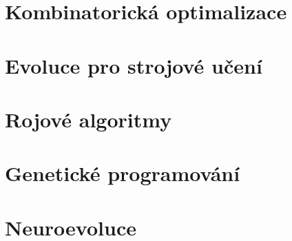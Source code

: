 \documentclass[a4paper,nofonts,nohyper,justified,colorinlistoftodos,hidelinks]{tufte-book}
\begin{document}
\chapter{Kombinatorická optimalizace}


\chapter{Evoluce pro strojové učení}


\chapter{Rojové algoritmy}


\chapter{Genetické programování}


\chapter{Neuroevoluce}





\backmatter

\setcounter{tocdepth}{2}
\tableofcontents
\listoffigures
\listoftables
\listofalgorithms 
\printindex
\listoftodos

\nocite{*}


\end{document}
